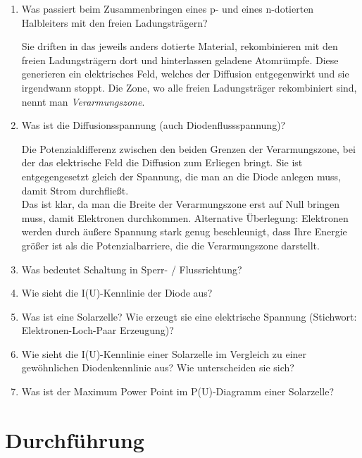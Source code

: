 \begin{enumerate}
	\item Was passiert beim Zusammenbringen eines p- und eines n-dotierten Halbleiters mit den freien Ladungsträgern?
	\begin{solution}
		Sie driften in das jeweils anders dotierte Material, rekombinieren mit den freien Ladungsträgern dort und hinterlassen geladene Atomrümpfe. Diese generieren ein elektrisches Feld, welches der Diffusion entgegenwirkt und sie irgendwann stoppt. Die Zone, wo alle freien Ladungsträger rekombiniert sind, nennt man \textit{Verarmungszone}.
	\end{solution}
	\item Was ist die Diffusionsspannung (auch Diodenflussspannung)?
	\begin{solution}
		Die Potenzialdifferenz zwischen den beiden Grenzen der Verarmungszone, bei der das elektrische Feld die Diffusion zum Erliegen bringt. Sie ist entgegengesetzt gleich der Spannung, die man an die Diode anlegen muss, damit Strom durchfließt. \\
		Das ist klar, da man die Breite der Verarmungszone erst auf Null bringen muss, damit Elektronen durchkommen. Alternative Überlegung: Elektronen werden durch äußere Spannung stark genug beschleunigt, dass Ihre Energie größer ist als die Potenzialbarriere, die die Verarmungszone darstellt.
	\end{solution}
	\item Was bedeutet Schaltung in Sperr- / Flussrichtung?
	\item Wie sieht die I(U)-Kennlinie der Diode aus? %
	\item Was ist eine Solarzelle? Wie erzeugt sie eine elektrische Spannung (Stichwort: Elektronen-Loch-Paar Erzeugung)?
	\item Wie sieht die I(U)-Kennlinie einer Solarzelle im Vergleich zu einer gewöhnlichen Diodenkennlinie aus? Wie unterscheiden sie sich?
	\item Was ist der Maximum Power Point im P(U)-Diagramm einer Solarzelle?
\end{enumerate}

\section{Durchführung} 


